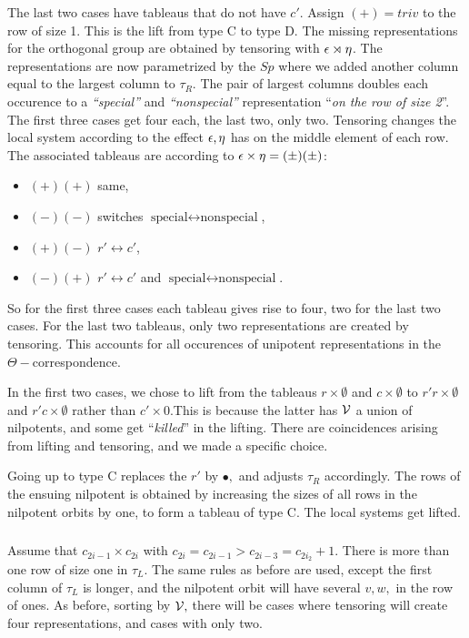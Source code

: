 \documentclass[11pt ,reqno]{amsart}
\begin{document}
The last two cases have  tableaus that do not have $c'.$ Assign
$(+)=triv$  to the row of size 1.  
  This is the lift from type C to type D. The missing representations
  for the orthogonal group are obtained by 
tensoring with ${\epsilon}\rtimes\eta$. The representations are now
parametrized by the $Sp$ where we added another column equal to the
largest column to $\tau_R$. The pair of largest columns doubles each occurence to
a \textit{``special''} and \textit{``nonspecial''} representation
``\textit{on the row of size 2}''. 
The first three cases get four each, the last two, only two. Tensoring changes
the local system according to the effect ${\epsilon},\eta$ has on the
middle element of each row.  The associated tableaus are according to
${\epsilon}\times\eta=(\pm)(\pm)$:
\begin{itemize}
\item $(+)(+)$ same,
\item $(-)(-)$ switches $\text{special}\longleftrightarrow \text{nonspecial}$,
\item $(+)(-)$ $r'\longleftrightarrow c'$,
\item $(-)(+)$ $r'\longleftrightarrow  c'$ and
      $\text{special}\longleftrightarrow \text{nonspecial}$.
    \end{itemize}
So for the first three cases each tableau gives rise to four, two for the last two cases.
For the last two tableaus, only two  representations are created by
tensoring. 
This accounts for all occurences of unipotent representations in the
$\Theta-$correspondence.
\begin{remark}
In the first two cases, we chose to  lift from the tableaus
$r\times\emptyset$ and $c\times\emptyset$ to 
$r'r\times\emptyset$ and $r'c\times\emptyset$ rather than  $c'\times
0$.This is  because the latter has ${\mathcal V}$ a union of nilpotents, and some get
``\textit{killed}''  in the lifting. There are coincidences arising
from lifting and tensoring, and we made a specific choice.
\end{remark}


Going up to type C
replaces the $r'$ by $\bullet,$ and adjusts $\tau_R$ accordingly. The
rows of the ensuing nilpotent is obtained by increasing the sizes of all rows in
the nilpotent orbits by one, to form a tableau of type C. The local
systems get lifted. 
\subsubsection{} Assume that $c_{2i-1}\times c_{2i}$ with
$c_{2i}=c_{2i-1}>c_{2i-3}=c_{2i_2}+1.$  There is more than one row of
size one in $\tau_L$. The same rules as before are used, except the
first column of $\tau_L$ is longer, and the nilpotent orbit will have
several $v,w,$ in the row of ones.  As before,
sorting by ${\mathcal V},$ there will be cases where tensoring will create four
representations, and cases with only two.
\end{document}
